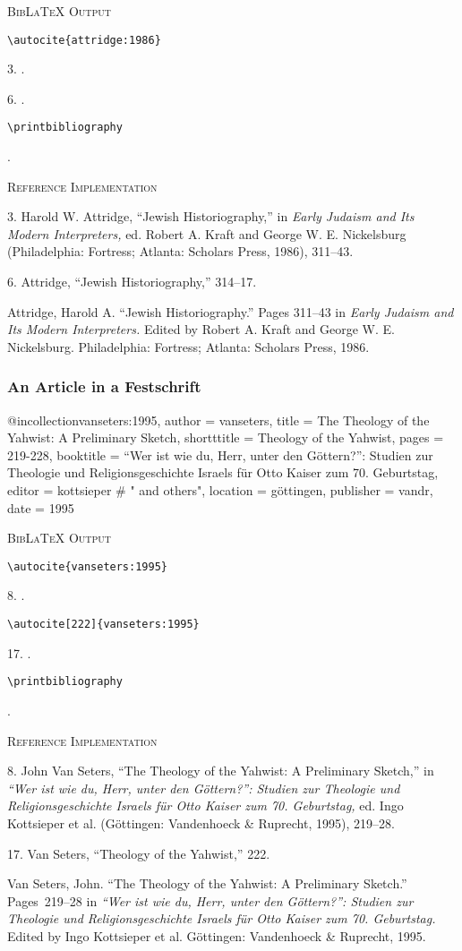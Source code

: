 \documentclass[a4paper]{article}
\newcommand\citetestnp[3]{%
  {\textsc{BibLaTeX Output}\par
   \nobreak
   \texttt{\textbackslash autocite\{#3\}}\par
   \color{biblatex-colour}
   #1. \cite{#3}.\par
   #2. \cite{#3}.\par
   \color{black}
   \texttt{\textbackslash printbibliography}\par
   \color{biblatex-colour}
   \hangindent\bibindent\bibentrycite{#3}.\par}}
\newcommand\citetestnpf[4]{%
  {\textsc{BibLaTeX Output}\par
   \nobreak
   \texttt{\textbackslash autocite\{#4\}}\par
   \color{biblatex-colour}
   #1. \cite{#4}.\par
   \color{black}
   \texttt{\textbackslash autocite[#3]\{#4\}}\par
   \color{biblatex-colour}
   #2. \cite[#3]{#4}.\par
   \color{black}
   \texttt{\textbackslash printbibliography}\par
   \color{biblatex-colour}
   \hangindent\bibindent\bibentrycite{#4}.\par}}
\newenvironment{refimp}{%
  \begin{minipage}{\linewidth}
    \setlength{\parskip}{1ex}
    \textsc{Reference Implementation}\par
    \nobreak
    \color{reference-colour}
}{\end{minipage}}
\newenvironment{vb}{%
  \setlength{\parskip}{0pt}
  \verbatim}{\endverbatim}
\begin{document}
\citetestnp{3}{6}{attridge:1986}

\begin{refimp}
  3. Harold W. Attridge, “Jewish Historiography,” in \emph{Early Judaism and
  Its Modern Interpreters,} ed. Robert A. Kraft and George W. E. Nickelsburg
  (Philadelphia: Fortress; Atlanta: Scholars Press, 1986), 311–43.
  
  6. Attridge, “Jewish Historiography,” 314–17.

  Attridge, Harold A. “Jewish Historiography.” Pages 311–43 in \emph{Early
  Judaism and Its Modern Interpreters.} Edited by Robert A. Kraft and George
  W. E. Nickelsburg. Philadelphia: Fortress; Atlanta: Scholars Press, 1986.
\end{refimp}

\subsubsection{An Article in a Festschrift}

\begin{vb}
@incollection{vanseters:1995,
  author = vanseters,
  title = {The Theology of the Yahwist: A Preliminary Sketch},
  shortttitle = {Theology of the Yahwist},
  pages = {219-228},
  booktitle = {“Wer ist wie du, Herr, unter den Göttern?”:
               Studien zur Theologie und Religionsgeschichte
               Israels für Otto Kaiser zum 70. Geburtstag},
  editor = kottsieper # " and others",
  location = göttingen,
  publisher = vandr,
  date = {1995}
}
\end{vb}  

\citetestnpf{8}{17}{222}{vanseters:1995}

\begin{refimp}
  8. John Van Seters, “The Theology of the Yahwist: A Preliminary Sketch,” in
  \emph{“Wer ist wie du, Herr, unter den Göttern?”: Studien zur Theologie und
  Religionsgeschichte Israels für Otto Kaiser zum 70. Geburtstag,} ed. Ingo
  Kottsieper et al. (Göttingen: Vandenhoeck \& Ruprecht, 1995), 219–28.

  17. Van Seters, “Theology of the Yahwist,” 222.

  \hangindent\bibindent Van Seters, John. “The Theology of the Yahwist: A
  Preliminary Sketch.” Pages~219–28 in \emph{“Wer ist wie du, Herr, unter den
  Göttern?”: Studien zur Theologie und Religionsgeschichte Israels für Otto
  Kaiser zum 70. Geburtstag.} Edited by Ingo Kottsieper et al. Göttingen:
  Vandenhoeck \& Ruprecht, 1995.
\end{refimp}
\end{document}
